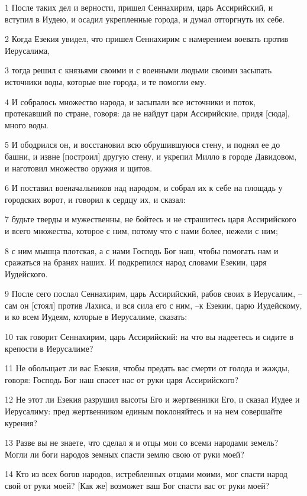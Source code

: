\par 1 После таких дел и верности, пришел Сеннахирим, царь Ассирийский, и вступил в Иудею, и осадил укрепленные города, и думал отторгнуть их себе.
\par 2 Когда Езекия увидел, что пришел Сеннахирим с намерением воевать против Иерусалима,
\par 3 тогда решил с князьями своими и с военными людьми своими засыпать источники воды, которые вне города, и те помогли ему.
\par 4 И собралось множество народа, и засыпали все источники и поток, протекавший по стране, говоря: да не найдут цари Ассирийские, придя [сюда], много воды.
\par 5 И ободрился он, и восстановил всю обрушившуюся стену, и поднял ее до башни, и извне [построил] другую стену, и укрепил Милло в городе Давидовом, и наготовил множество оружия и щитов.
\par 6 И поставил военачальников над народом, и собрал их к себе на площадь у городских ворот, и говорил к сердцу их, и сказал:
\par 7 будьте тверды и мужественны, не бойтесь и не страшитесь царя Ассирийского и всего множества, которое с ним, потому что с нами более, нежели с ним;
\par 8 с ним мышца плотская, а с нами Господь Бог наш, чтобы помогать нам и сражаться на бранях наших. И подкрепился народ словами Езекии, царя Иудейского.
\par 9 После сего послал Сеннахирим, царь Ассирийский, рабов своих в Иерусалим, --сам он [стоял] против Лахиса, и вся сила его с ним, --к Езекии, царю Иудейскому, и ко всем Иудеям, которые в Иерусалиме, сказать:
\par 10 так говорит Сеннахирим, царь Ассирийский: на что вы надеетесь и сидите в крепости в Иерусалиме?
\par 11 Не обольщает ли вас Езекия, чтобы предать вас смерти от голода и жажды, говоря: Господь Бог наш спасет нас от руки царя Ассирийского?
\par 12 Не этот ли Езекия разрушил высоты Его и жертвенники Его, и сказал Иудее и Иерусалиму: пред жертвенником единым поклоняйтесь и на нем совершайте курения?
\par 13 Разве вы не знаете, что сделал я и отцы мои со всеми народами земель? Могли ли боги народов земных спасти землю свою от руки моей?
\par 14 Кто из всех богов народов, истребленных отцами моими, мог спасти народ свой от руки моей? [Как же] возможет ваш Бог спасти вас от руки моей?
